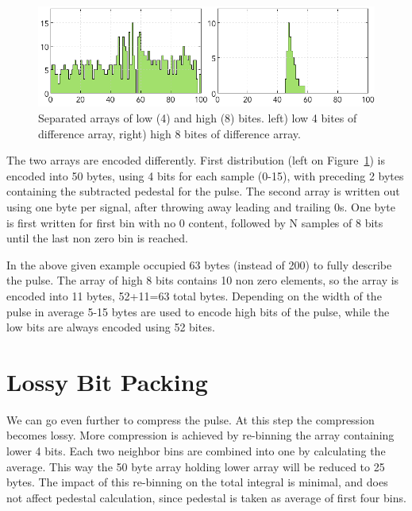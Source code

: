 \documentclass[12pt]{article}
\begin{document}
\begin{figure}[!h]
\begin{center}

 \includegraphics[width=6in]{pics/fadc_pulse_bits.png}

 \caption {Separated arrays of low (4) and high (8) bites. left) low 4 bites of difference array,
 right) high 8 bites of difference array. }
 \label{FADC_PULSE_BITS}
 \end{center}
\end{figure}

The two arrays are encoded differently. First distribution (left on Figure~\ref{FADC_PULSE_BITS}) is encoded into 50 bytes, using 4 bits for each sample (0-15), with preceding 2 bytes containing the subtracted pedestal for the pulse. The second array is written out using one byte per signal, after
throwing away leading and trailing 0s. One byte is first written for first bin with no 0 content, followed
by N samples of 8 bits until the last non zero bin is reached.

In the above given example occupied 63 bytes (instead of 200) to fully describe the pulse.
The array of high 8 bits contains 10 non zero elements, so the array is encoded into 11 bytes,
52+11=63 total bytes. Depending on the width of the pulse in average 5-15 bytes are used to encode high bits of the pulse, while the low bits are always encoded using 52 bites.

\section{Lossy Bit Packing}

We can go even further to compress the pulse. At this step the compression becomes lossy.
More compression is achieved by re-binning the array containing lower 4 bits. Each two neighbor
bins are combined into one by calculating the average. This way the 50 byte array holding lower
array will be reduced to 25 bytes. The impact of this re-binning on the total integral is minimal, and
does not affect pedestal calculation, since pedestal is taken as average of first four bins.
\end{document}
